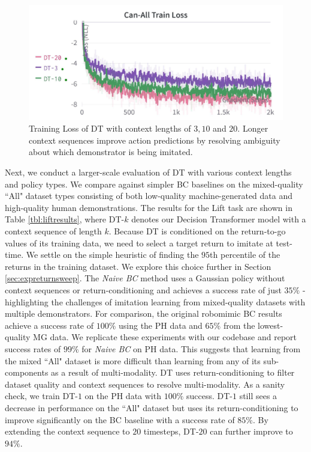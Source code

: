 \begin{figure}
    \centering
    \includegraphics[width=\linewidth]{figs/can_all_train_loss.png}
    \caption{Training Loss of DT with context lengths of $3, 10$ and $20$. Longer context sequences improve action predictions by resolving ambiguity about which demonstrator is being imitated.}
    \label{fig:can_all_train_loss}
\end{figure}

Next, we conduct a larger-scale evaluation of DT with various context lengths and policy types. We compare against simpler BC baselines on the mixed-quality ``All" dataset types consisting of both low-quality machine-generated data and high-quality human demonstrations. The results for the Lift task are shown in Table \ref{tbl:liftresults}, where DT-$k$ denotes our Decision Transformer model with a context sequence of length $k$. Because DT is conditioned on the return-to-go values of its training data, we need to select a target return to imitate at test-time. We settle on the simple heuristic of finding the $95$th percentile of the returns in the training dataset. We explore this choice further in Section \ref{sec:expreturnsweep}. The \textit{Naive BC} method uses a Gaussian policy without context sequences or return-conditioning and achieves a success rate of just $35\%$ - highlighting the challenges of imitation learning from mixed-quality datasets with multiple demonstrators. For comparison, the original robomimic BC results achieve a success rate of $100\%$ using the PH data and $65\%$ from the lowest-quality MG data. We replicate these experiments with our codebase and report success rates of $99\%$ for \textit{Naive BC} on PH data. This suggests that learning from the mixed ``All" dataset is more difficult than learning from any of its sub-components as a result of multi-modality. DT uses return-conditioning to filter dataset quality and context sequences to resolve multi-modality. As a sanity check, we train DT-$1$ on the PH data with $100\%$ success. DT-$1$ still sees a decrease in performance on the ``All" dataset but uses its return-conditioning to improve significantly on the BC baseline with a success rate of $85\%$. By extending the context sequence to $20$ timesteps, DT-$20$ can further improve to $94\%$.

